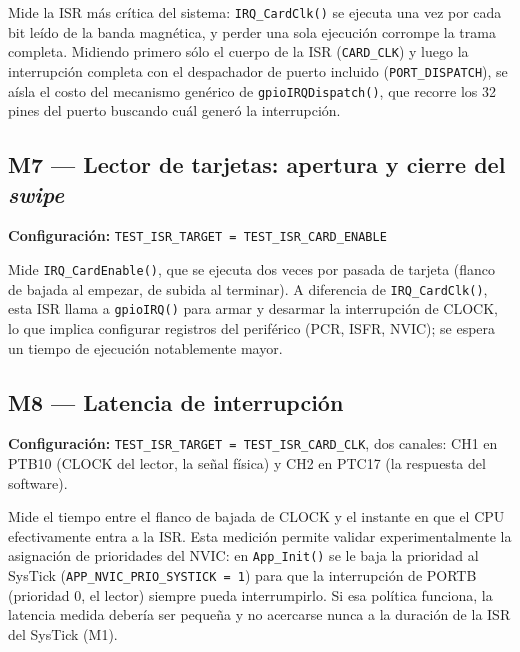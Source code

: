 \documentclass[11pt,a4paper]{article}
\begin{document}
Mide la ISR más crítica del sistema: \texttt{IRQ\_CardClk()} se ejecuta una
vez por cada bit leído de la banda magnética, y perder una sola ejecución
corrompe la trama completa. Midiendo primero sólo el cuerpo de la ISR
(\texttt{CARD\_CLK}) y luego la interrupción completa con el despachador de
puerto incluido (\texttt{PORT\_DISPATCH}), se aísla el costo del mecanismo
genérico de \texttt{gpioIRQDispatch()}, que recorre los 32 pines del puerto
buscando cuál generó la interrupción.

\subsection{M7 --- Lector de tarjetas: apertura y cierre del \textit{swipe}}
\textbf{Configuración:} \texttt{TEST\_ISR\_TARGET = TEST\_ISR\_CARD\_ENABLE}

Mide \texttt{IRQ\_CardEnable()}, que se ejecuta dos veces por pasada de
tarjeta (flanco de bajada al empezar, de subida al terminar). A diferencia
de \texttt{IRQ\_CardClk()}, esta ISR llama a \texttt{gpioIRQ()} para armar y
desarmar la interrupción de CLOCK, lo que implica configurar registros del
periférico (PCR, ISFR, NVIC); se espera un tiempo de ejecución notablemente
mayor.

\subsection{M8 --- Latencia de interrupción}
\textbf{Configuración:} \texttt{TEST\_ISR\_TARGET = TEST\_ISR\_CARD\_CLK},
dos canales: CH1 en PTB10 (CLOCK del lector, la señal física) y CH2 en
PTC17 (la respuesta del software).

Mide el tiempo entre el flanco de bajada de CLOCK y el instante en que el
CPU efectivamente entra a la ISR. Esta medición permite validar
experimentalmente la asignación de prioridades del NVIC: en
\texttt{App\_Init()} se le baja la prioridad al SysTick
(\texttt{APP\_NVIC\_PRIO\_SYSTICK = 1}) para que la interrupción de PORTB
(prioridad 0, el lector) siempre pueda interrumpirlo. Si esa política
funciona, la latencia medida debería ser pequeña y no acercarse nunca a la
duración de la ISR del SysTick (M1).
\end{document}
